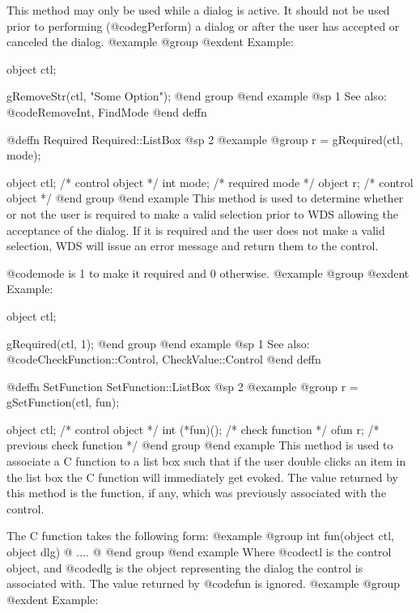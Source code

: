 This method may only be used while a dialog is active.  It should not be
used prior to performing (@code{gPerform}) a dialog or after the user
has accepted or canceled the dialog.
@example
@group
@exdent Example:

object  ctl;

gRemoveStr(ctl, "Some Option");
@end group
@end example
@sp 1
See also:  @code{RemoveInt, FindMode}
@end deffn















@deffn {Required} Required::ListBox
@sp 2
@example
@group
r = gRequired(ctl, mode);

object  ctl;    /*  control object  */
int     mode;   /*  required mode   */
object  r;      /*  control object  */
@end group
@end example
This method is used to determine whether or not the user is required to
make a valid selection prior to WDS allowing the acceptance of the dialog.
If it is required and the user does not make a valid selection, WDS
will issue an error message and return them to the control.

@code{mode} is 1 to make it required and 0 otherwise.
@example
@group
@exdent Example:

object  ctl;

gRequired(ctl, 1);
@end group
@end example
@sp 1
See also:  @code{CheckFunction::Control, CheckValue::Control}
@end deffn








@deffn {SetFunction} SetFunction::ListBox
@sp 2
@example
@group
r = gSetFunction(ctl, fun);

object  ctl;      /*  control object           */
int     (*fun)(); /*  check function           */
ofun    r;        /*  previous check function  */
@end group
@end example
This method is used to associate a C function to a list box such that if
the user double clicks an item in the list box the C function will
immediately get evoked.  The value returned by this method is the
function, if any, which was previously associated with the control.

The C function takes the following form:
@example
@group
int     fun(object ctl, object dlg)
@{
        ....
@}
@end group
@end example
Where @code{ctl} is the control object, and @code{dlg} is the object
representing the dialog the control is associated with.  The value
returned by @code{fun} is ignored.
@example
@group
@exdent Example:

